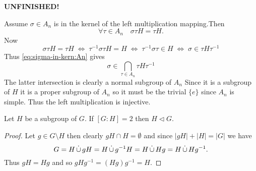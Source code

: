 \documentclass[12pt]{book}
\def\DOTSB{\relax}
\def\dotcup{\DOTSB\mathop{\overset{\textstyle.}\cup}}
\newcommand{\UNFINISHED}{\large\textbf{UNFINISHED!}}
\def\subnormal{\vartriangleleft}
\newcounter{myenumi}
\newenvironment{myenumerate}
{\begin{enumerate}
 \setcounter{enumi}{\themyenumi}
}
{\setcounter{myenumi}{\theenumi}
 \end{enumerate}}
\begin{document}
\begin{myenumerate}
\begin{enumerate}[(a)]
\UNFINISHED

Assume \(\sigma \in A_n\) is in the kernel
of the left multiplication mapping.Then 
\begin{equation} \label{eq:sigma-in-kern:An}
\forall \tau\in A_n\quad \sigma\tau H = \tau H.
\end{equation}
Now
\begin{equation*}
\sigma\tau H = \tau H
\;\Leftrightarrow\;
\tau^{-1}\sigma\tau H = H
\;\Leftrightarrow\;
\tau^{-1}\sigma\tau \in H
\;\Leftrightarrow\;
\sigma \in \tau H \tau^{-1}
\end{equation*}
Thus \eqref{eq:sigma-in-kern:An} gives
\begin{equation*}
\sigma \in \bigcap_{\tau\in A_n} \tau H \tau^{-1}
\end{equation*}
The latter intersection is clearly a normal subgroup of \(A_n\)
Since it is a subgroup of $H$ it is a proper subgroup of \(A_n\)
so it must be the trivial \(\{e\}\) since \(A_n\) is simple.
Thus the left multiplication is injective.


\begin{llem} \label{llem:half:normal}
Let $H$ be a subgroup of $G$. If \([G:H]=2\) then \(H \subnormal G\).
\end{llem}
\begin{proof}
Let \(g \in G\setminus H\) then clearly  \(gH\cap H = \emptyset\)
and since \(|gH| + |H| = |G|\) we have
\begin{equation*}
G = H \dotcup gH = H \dotcup g^{-1}H = H \dotcup Hg = H \dotcup Hg^{-1}.
\end{equation*}
Thus \(gH = Hg\) and so \(gHg^{-1}= (Hg)g^{-1} = H\).
\end{proof}


\end{enumerate}
\end{myenumerate}
\end{document}
